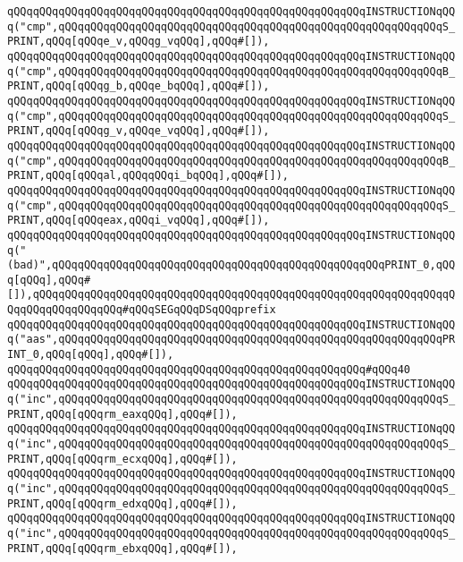 \verb|qQQqqQQqqQQqqQQqqQQqqQQqqQQqqQQqqQQqqQQqqQQqqQQqqQQqqQQqINSTRUCTIONqQQq("cmp",qQQqqQQqqQQqqQQqqQQqqQQqqQQqqQQqqQQqqQQqqQQqqQQqqQQqqQQqqQQqS_PRINT,qQQq[qQQqe_v,qQQqg_vqQQq],qQQq#[]),|\newline
\verb|qQQqqQQqqQQqqQQqqQQqqQQqqQQqqQQqqQQqqQQqqQQqqQQqqQQqqQQqINSTRUCTIONqQQq("cmp",qQQqqQQqqQQqqQQqqQQqqQQqqQQqqQQqqQQqqQQqqQQqqQQqqQQqqQQqqQQqB_PRINT,qQQq[qQQqg_b,qQQqe_bqQQq],qQQq#[]),|\newline
\verb|qQQqqQQqqQQqqQQqqQQqqQQqqQQqqQQqqQQqqQQqqQQqqQQqqQQqqQQqINSTRUCTIONqQQq("cmp",qQQqqQQqqQQqqQQqqQQqqQQqqQQqqQQqqQQqqQQqqQQqqQQqqQQqqQQqqQQqS_PRINT,qQQq[qQQqg_v,qQQqe_vqQQq],qQQq#[]),|\newline
\verb|qQQqqQQqqQQqqQQqqQQqqQQqqQQqqQQqqQQqqQQqqQQqqQQqqQQqqQQqINSTRUCTIONqQQq("cmp",qQQqqQQqqQQqqQQqqQQqqQQqqQQqqQQqqQQqqQQqqQQqqQQqqQQqqQQqqQQqB_PRINT,qQQq[qQQqal,qQQqqQQqi_bqQQq],qQQq#[]),|\newline
\verb|qQQqqQQqqQQqqQQqqQQqqQQqqQQqqQQqqQQqqQQqqQQqqQQqqQQqqQQqINSTRUCTIONqQQq("cmp",qQQqqQQqqQQqqQQqqQQqqQQqqQQqqQQqqQQqqQQqqQQqqQQqqQQqqQQqqQQqS_PRINT,qQQq[qQQqeax,qQQqi_vqQQq],qQQq#[]),|\newline
\verb|qQQqqQQqqQQqqQQqqQQqqQQqqQQqqQQqqQQqqQQqqQQqqQQqqQQqqQQqINSTRUCTIONqQQq("(bad)",qQQqqQQqqQQqqQQqqQQqqQQqqQQqqQQqqQQqqQQqqQQqqQQqqQQqPRINT_0,qQQq[qQQq],qQQq#[]),qQQqqQQqqQQqqQQqqQQqqQQqqQQqqQQqqQQqqQQqqQQqqQQqqQQqqQQqqQQqqQQqqQQqqQQqqQQqqQQqqQQq#qQQqSEGqQQqDSqQQqprefix|\newline
\verb|qQQqqQQqqQQqqQQqqQQqqQQqqQQqqQQqqQQqqQQqqQQqqQQqqQQqqQQqINSTRUCTIONqQQq("aas",qQQqqQQqqQQqqQQqqQQqqQQqqQQqqQQqqQQqqQQqqQQqqQQqqQQqqQQqqQQqPRINT_0,qQQq[qQQq],qQQq#[]),|\newline
\verb|qQQqqQQqqQQqqQQqqQQqqQQqqQQqqQQqqQQqqQQqqQQqqQQqqQQqqQQq#qQQq40|\newline
\verb|qQQqqQQqqQQqqQQqqQQqqQQqqQQqqQQqqQQqqQQqqQQqqQQqqQQqqQQqINSTRUCTIONqQQq("inc",qQQqqQQqqQQqqQQqqQQqqQQqqQQqqQQqqQQqqQQqqQQqqQQqqQQqqQQqqQQqS_PRINT,qQQq[qQQqrm_eaxqQQq],qQQq#[]),|\newline
\verb|qQQqqQQqqQQqqQQqqQQqqQQqqQQqqQQqqQQqqQQqqQQqqQQqqQQqqQQqINSTRUCTIONqQQq("inc",qQQqqQQqqQQqqQQqqQQqqQQqqQQqqQQqqQQqqQQqqQQqqQQqqQQqqQQqqQQqS_PRINT,qQQq[qQQqrm_ecxqQQq],qQQq#[]),|\newline
\verb|qQQqqQQqqQQqqQQqqQQqqQQqqQQqqQQqqQQqqQQqqQQqqQQqqQQqqQQqINSTRUCTIONqQQq("inc",qQQqqQQqqQQqqQQqqQQqqQQqqQQqqQQqqQQqqQQqqQQqqQQqqQQqqQQqqQQqS_PRINT,qQQq[qQQqrm_edxqQQq],qQQq#[]),|\newline
\verb|qQQqqQQqqQQqqQQqqQQqqQQqqQQqqQQqqQQqqQQqqQQqqQQqqQQqqQQqINSTRUCTIONqQQq("inc",qQQqqQQqqQQqqQQqqQQqqQQqqQQqqQQqqQQqqQQqqQQqqQQqqQQqqQQqqQQqS_PRINT,qQQq[qQQqrm_ebxqQQq],qQQq#[]),|\newline
